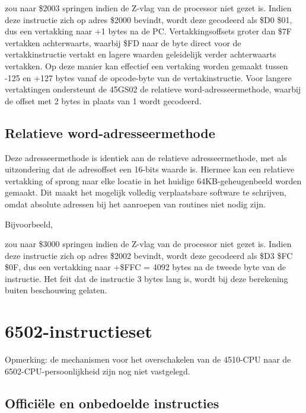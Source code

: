zou naar \$2003 springen indien de Z-vlag van de processor niet gezet is. Indien deze instructie zich op adres \$2000 bevindt, wordt deze gecodeerd als \$D0 \$01, dus een vertakking naar +1 bytes na de PC. Vertakkingsoffsets groter dan \$7F vertakken achterwaarts, waarbij \$FD naar de byte direct voor de vertakkinstructie vertakt en lagere waarden geleidelijk verder achterwaarts vertakken. Op deze manier kan effectief een vertaking worden gemaakt tussen -125 en +127 bytes vanaf de opcode-byte van de vertakinstructie. Voor langere vertaktingen ondersteunt de 45GS02 de relatieve word-adresseermethode, waarbij de offset met 2 bytes in plaats van 1 wordt gecodeerd.

\subsection{Relatieve word-adresseermethode}

Deze adresseermethode is identiek aan de relatieve adresseermethode, met als uitzondering dat de adresoffset een 16-bits waarde is. Hiermee kan een relatieve vertakking of sprong naar elke locatie in het huidige 64KB-geheugenbeeld worden gemaakt. Dit maakt het mogelijk volledig verplaatsbare software te schrijven, omdat absolute adressen bij het aanroepen van routines niet nodig zijn.

Bijvoorbeeld,


zou naar \$3000 springen indien de Z-vlag van de processor niet gezet is. Indien deze instructie zich op adres \$2002 bevindt, wordt deze gecodeerd als \$D3 \$FC \$0F, dus een vertakking naar +\$FFC = 4092 bytes na de tweede byte van de instructie. Het feit dat de instructie 3 bytes lang is, wordt bij deze berekening buiten beschouwing gelaten.

\clearpage
\section{6502-instructieset}

Opmerking: de mechanismen voor het overschakelen van de 4510-CPU naar de 6502-CPU-persoonlijkheid zijn nog niet vastgelegd.

\subsection{Officiële en onbedoelde instructies}

